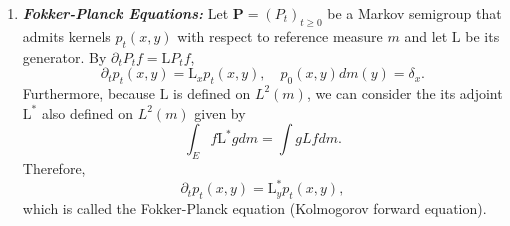 \begin{enumerate}[label=\arabic{*}.]
	For convex function $\phi$ such that $\phi(f) \in \mathcal{D}(\mathrm{L})$ when $f \in \mathcal{D}(\mathrm{L})$, Jensen's Inequality implies
	\begin{equation*}
		\mathrm{L}\phi(f) \geq \phi^\prime(f)\mathrm{L}f.
	\end{equation*}

	Let $(X_t)_{t \geq 0}$ (with $X_0 = x$) be the corresponding Markov process such that $t \mapsto f(X_t)$ is right-continuous and 
	\begin{equation*}
		M^f_t = f(X_t) - \int_0^t \mathrm{L}f(X_s)ds,\quad t \geq 0,
	\end{equation*}
	is a local martingale. If it is a true martingale, then $\E\bj{M^f_t} = \E\bj{M^f_0}$ implies that
	\begin{equation*}
		P_t f(x)=f(x)+\int_0^t P_s \mathrm{L} f(x) d s,
	\end{equation*}
	which, from the abstract semigroup view, 
	\begin{equation*}
		P_t=\mathrm{Id}+\int_0^t P_s \mathrm{L} d s.
	\end{equation*}
	Consider the Riesz functional calculus of $\mathrm{L}$,
	\begin{equation*}
		Q_t f=e^{t \mathrm{L}} f=\sum_{k =0}^\infty \frac{t^k}{k!} \mathrm{L}^k f
	\end{equation*}
	then $\partial_t Q_t = \mathrm{L} Q_t$. Therefore,
	\begin{equation*}
		P_t=Q_t=e^{t \mathrm{L}}.
	\end{equation*}

	\item \textbf{\emph{Fokker-Planck Equations:}} Let $\mathbf{P} = (P_t)_{t \geq 0}$ be a Markov semigroup that admits kernels $p_t(x,y)$ with respect to reference measure $m$ and let $\mathrm{L}$ be its generator. By $\partial_t P_t f=\mathrm{L} P_t f$,
	\begin{equation*}
		\partial_t p_t(x, y)=\mathrm{L}_x p_t(x, y), \quad p_0(x, y) d m(y)=\delta_x.
	\end{equation*}
	Furthermore, because $\mathrm{L}$ is defined on $L^2(m)$, we can consider the its adjoint $\mathrm{L}^*$ also defined on $L^2(m)$ given by
	\begin{equation*}
		\int_E f\mathrm{L}^* gdm = \int gLf dm.
	\end{equation*}
	Therefore,
	\begin{equation*}
		\partial_t p_t(x, y)=\mathrm{L}_y^* p_t(x, y),
	\end{equation*}
	which is called the Fokker-Planck equation (Kolmogorov forward equation).


\end{enumerate}
